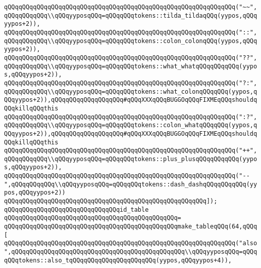 \verb|qQQqqQQqqQQqqQQqqQQqqQQqqQQqqQQqqQQqqQQqqQQqqQQqqQQqqQQqqQQqqQQq("~~",qQQqqQQqqQQq\\qQQqyyposqQQq=qQQqqQQqtokens::tilda_tildaqQQq(yypos,qQQqyypos+2)),|\newline
\verb|qQQqqQQqqQQqqQQqqQQqqQQqqQQqqQQqqQQqqQQqqQQqqQQqqQQqqQQqqQQqqQQq("::",qQQqqQQqqQQq\\qQQqyyposqQQq=qQQqqQQqtokens::colon_colonqQQq(yypos,qQQqyypos+2)),|\newline
\verb|qQQqqQQqqQQqqQQqqQQqqQQqqQQqqQQqqQQqqQQqqQQqqQQqqQQqqQQqqQQqqQQq("??",qQQqqQQqqQQq\\qQQqyyposqQQq=qQQqqQQqtokens::what_whatqQQqqQQqqQQq(yypos,qQQqyypos+2)),|\newline
\verb|qQQqqQQqqQQqqQQqqQQqqQQqqQQqqQQqqQQqqQQqqQQqqQQqqQQqqQQqqQQqqQQq("?:",qQQqqQQqqQQq\\qQQqyyposqQQq=qQQqqQQqtokens::what_colonqQQqqQQq(yypos,qQQqyypos+2)),qQQqqQQqqQQqqQQqqQQq#qQQqXXXqQQqBUGGOqQQqFIXMEqQQqshouldqQQqkillqQQqthis|\newline
\verb|qQQqqQQqqQQqqQQqqQQqqQQqqQQqqQQqqQQqqQQqqQQqqQQqqQQqqQQqqQQqqQQq(":?",qQQqqQQqqQQq\\qQQqyyposqQQq=qQQqqQQqtokens::colon_whatqQQqqQQq(yypos,qQQqyypos+2)),qQQqqQQqqQQqqQQqqQQq#qQQqXXXqQQqBUGGOqQQqFIXMEqQQqshouldqQQqkillqQQqthis|\newline
\verb|qQQqqQQqqQQqqQQqqQQqqQQqqQQqqQQqqQQqqQQqqQQqqQQqqQQqqQQqqQQqqQQq("++",qQQqqQQqqQQq\\qQQqyyposqQQq=qQQqqQQqtokens::plus_plusqQQqqQQqqQQq(yypos,qQQqyypos+2)),|\newline
\verb|qQQqqQQqqQQqqQQqqQQqqQQqqQQqqQQqqQQqqQQqqQQqqQQqqQQqqQQqqQQqqQQq("--",qQQqqQQqqQQq\\qQQqyyposqQQq=qQQqqQQqtokens::dash_dashqQQqqQQqqQQq(yypos,qQQqyypos+2))|\newline
\verb|qQQqqQQqqQQqqQQqqQQqqQQqqQQqqQQqqQQqqQQqqQQqqQQqqQQqqQQq]);|\newline
\newline
\verb|qQQqqQQqqQQqqQQqqQQqqQQqqQQqqQQqid_table|\newline
\verb|qQQqqQQqqQQqqQQqqQQqqQQqqQQqqQQqqQQqqQQqqQQqqQQq=|\newline
\verb|qQQqqQQqqQQqqQQqqQQqqQQqqQQqqQQqqQQqqQQqqQQqqQQqmake_tableqQQq(64,qQQq[|\newline
\verb|qQQqqQQqqQQqqQQqqQQqqQQqqQQqqQQqqQQqqQQqqQQqqQQqqQQqqQQqqQQqqQQq("also",qQQqqQQqqQQqqQQqqQQqqQQqqQQqqQQqqQQqqQQqqQQqqQQq\\qQQqyyposqQQq=qQQqqQQqtokens::also_tqQQqqQQqqQQqqQQqqQQqqQQq(yypos,qQQqyypos+4)),|\newline
